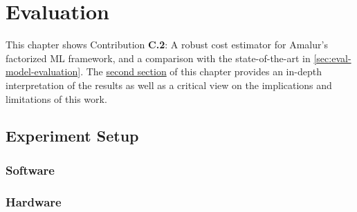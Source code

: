 
\chapter{Evaluation}
\label{chapter:evaluation-discussion}
This chapter shows Contribution \textbf{C.2}: A robust cost estimator for Amalur's factorized ML framework, and a comparison with the state-of-the-art in \autoref{sec:eval-model-evaluation}. The \hyperref[sec:eval-discussion]{second section} of this chapter provides an in-depth interpretation of the results as well as a critical view on the implications and limitations of this work.

\section{Experiment Setup}

\label{sec:experiment-setup}


\subsection{Software}



\subsection{Hardware}


